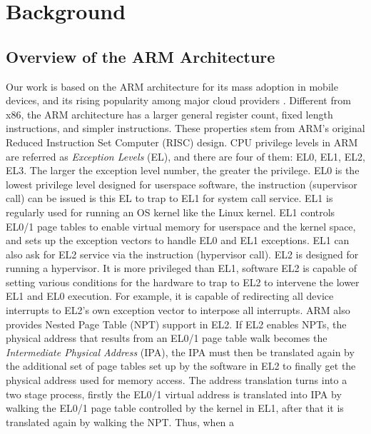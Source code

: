
\chapter{Background}
\label{sec:bg}

\section{Overview of the ARM Architecture}
\label{sec:armarch}

Our work is based on the ARM architecture for its mass adoption in mobile
devices, and its rising popularity among major cloud providers
\cite{armaws, armgooglecloud}. Different from x86, the ARM architecture has a
larger general register count, fixed length instructions, and simpler
instructions. These properties stem from ARM's original Reduced Instruction
Set Computer (RISC) design. CPU privilege levels in ARM are referred as
\textit{Exception Levels} (EL), and there are four of them: EL0, EL1, EL2, EL3.
The larger the exception level number, the greater the privilege. EL0 is the
lowest privilege level designed for userspace software, the  instruction
(supervisor call) can be issued is this EL to trap to EL1 for system call
service. EL1 is regularly used for running an OS kernel like the Linux kernel.
EL1 controls EL0/1 page tables to enable virtual memory for userspace and the
kernel space,
and sets up the exception vectors to handle EL0 and EL1 exceptions. EL1 can
also ask for EL2 service via the  instruction (hypervisor call). EL2
is designed for running a hypervisor. It is more privileged than EL1, software
EL2 is capable of setting various conditions for the hardware to trap to EL2 to
intervene the lower EL1 and EL0 execution. For example, it is capable of
redirecting all device interrupts to EL2's own exception vector to interpose
all interrupts. ARM also provides Nested Page Table (NPT) support in EL2. If
EL2 enables NPTs, the physical address that results from an EL0/1 page table walk
becomes the \textit{Intermediate Physical Address} (IPA), the IPA must then be
translated again by the additional set of page tables set up by the software in
EL2 to finally get the physical address used for memory access. The address
translation turns into a two stage process, firstly the EL0/1 virtual address
is translated into IPA by walking the EL0/1 page table controlled by the kernel
in EL1, after that it is translated again by walking the NPT. Thus, when a
